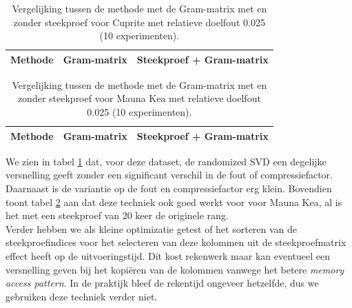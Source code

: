\begin{table}[]
\centering
\begin{tabular}{|l|l|l|}
\hline
Methode & Gram-matrix & Steekproef + Gram-matrix\\ \hline

\end{tabular}
\caption{Vergelijking tussen de methode met de Gram-matrix met en zonder steekproef voor Cuprite met relatieve doelfout 0.025 (10 experimenten).}
\label{table:randomized-svd-cuprite-average}
\end{table}

\begin{table}[]
\centering
\begin{tabular}{|l|l|l|}
\hline
Methode & Gram-matrix & Steekproef + Gram-matrix\\ \hline

\end{tabular}
\caption{Vergelijking tussen de methode met de Gram-matrix met en zonder steekproef voor Mauna Kea met relatieve doelfout 0.025 (10 experimenten).}
\label{table:randomized-svd-mauna-kea-average}
\end{table}

We zien in tabel \ref{table:randomized-svd-cuprite-average} dat, voor deze dataset, de randomized SVD een degelijke versnelling geeft zonder een significant verschil in de fout of compressiefactor. Daarnaast is de variantie op de fout en compressiefactor erg klein. Bovendien toont tabel \ref{table:randomized-svd-mauna-kea-average} aan dat deze techniek ook goed werkt voor voor Mauna Kea, al is het met een steekproef van 20 keer de originele rang.\\

Verder hebben we als kleine optimizatie getest of het sorteren van de steekproefindices voor het selecteren van deze kolommen uit de steekproefmatrix effect heeft op de uitvoeringstijd. Dit kost rekenwerk maar kan eventueel een versnelling geven bij het kopi\"eren van de kolommen vanwege het betere \textit{memory access pattern}. In de praktijk bleef de rekentijd ongeveer hetzelfde, dus we gebruiken deze techniek verder niet.\\

